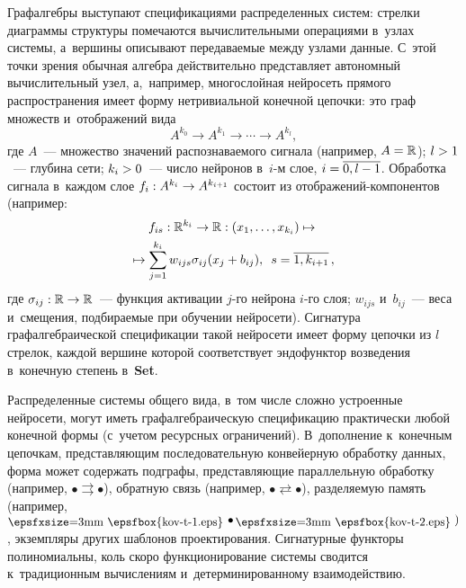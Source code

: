 \begin{multicols}{2}
     Графалгебры выступают спецификациями распределенных сис\-тем: 
стрелки диаграммы структуры помечаются вычислительными операциями 
в~узлах системы, а~вершины описывают передаваемые между узлами данные. 
С~этой точки зрения обычная алгебра действительно представляет автономный 
вычислительный узел, а,~например, многослойная нейросеть прямого 
распространения имеет форму нетривиальной конечной цепочки: это граф 
множеств и~отображений вида
     $$
A^{k_0}\to  A^{k_1}\to \cdots\to  A^{k_l},
$$
где $A$~--- множество значений распознаваемого сигнала (например, $A\hm= 
\mathbb{R}$); $l \hm> 1$~--- глубина сети; $k_i \hm> 0$~--- число нейронов  
в~$i$-м слое, $i \hm= \overline{0,  l - 1}$. Обработка сигнала в~каждом слое $f_i : 
A^{k_i}\hm\to  A^{k_{i+1}}$ состоит из отоб\-ра\-же\-ний-ком\-по\-нен\-тов (например:
\begin{multline*}
     f_{is} : \mathbb{R}^{k_i} \to \mathbb{R} : (x_1, \ldots, x_{k_i}) \mapsto {}\\
     \mapsto
\sum\limits_{j=1}^{k_i}  w_{ijs}\sigma_{ij}(x_j + b_{ij}),\enskip
      s = \overline{1, k_{i+1}}\,,
     \end{multline*}
где $\sigma_{ij} : \mathbb{R}\hm\to \mathbb{R}$~--- функция активации $j$-го нейрона $i$-го 
слоя; $w_{ijs}$ и~$b_{ij}$~--- веса и~смещения, подбираемые при обучении 
нейросети). Сигнатура графалгебраической спецификации такой нейросети 
имеет форму цепочки из $l$ стрелок, каждой вершине которой соответствует 
эндофунктор возведения в~конечную степень в~\textbf{Set}.
     
     Распределенные системы общего вида, в~том числе сложно устроенные 
нейросети, могут иметь графалгебраическую спецификацию практически 
любой конечной формы (с~учетом ресурсных ограничений). В~дополнение 
к~конечным цепочкам, пред\-став\-ля\-ющим последовательную конвейерную 
обработку данных, форма может содержать подграфы, представляющие 
параллельную обработку (например, $\bullet \rightrightarrows 
\bullet$), обратную связь (например, $\bullet 
\rightleftarrows\bullet$), разделяемую память (например, $\hspace*{-4pt}{\raisebox{-2pt}{
\epsfxsize=3mm %
\epsfbox{kov-t-1.eps}
}}\! 
\bullet \hspace*{-4pt}{\raisebox{-2pt}{
\epsfxsize=3mm %
\epsfbox{kov-t-2.eps}
}})$, экземпляры других шаблонов проектирования. Сигнатурные 
функторы полиномиальны, коль скоро функционирование сис\-те\-мы сводится 
к~традиционным вычислениям и~детерминированному взаимодействию.


\end{multicols}
